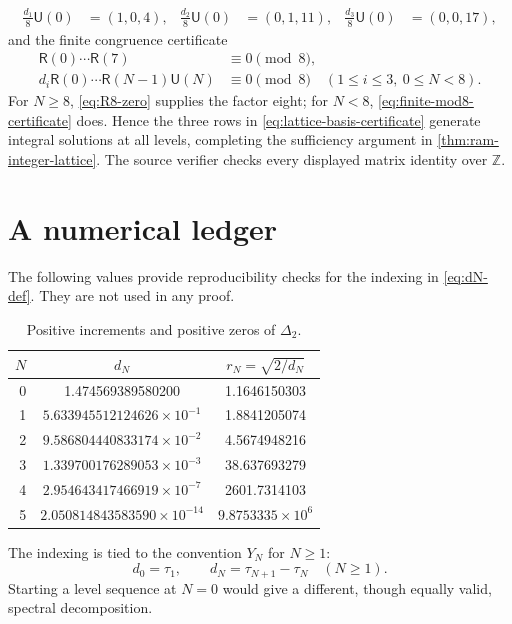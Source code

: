 \documentclass[11pt]{article}
\theoremstyle{keio}
\theoremstyle{definition}
\theoremstyle{remark}
\newcommand{\Z}{\mathbb Z}
\begin{document}
\begin{align}
 \frac{d_1}{8}\mathsf U(0)&=(1,0,4),&
 \frac{d_2}{8}\mathsf U(0)&=(0,1,11),&
 \frac{d_3}{8}\mathsf U(0)&=(0,0,17),
 \label{eq:lattice-basis-certificate}
\end{align}
and the finite congruence certificate
\begin{align}
 \mathsf R(0)\cdots\mathsf R(7)&\equiv0\pmod8,
 \label{eq:R8-zero}\\
 d_i\mathsf R(0)\cdots\mathsf R(N-1)\mathsf U(N)&\equiv0\pmod8
 \quad(1\le i\le3,\ 0\le N<8).
 \label{eq:finite-mod8-certificate}
\end{align}
For \(N\ge8\), \eqref{eq:R8-zero} supplies the factor eight; for
\(N<8\), \eqref{eq:finite-mod8-certificate} does.  Hence the three rows in
\eqref{eq:lattice-basis-certificate} generate integral solutions at all
levels, completing the sufficiency argument in
\cref{thm:ram-integer-lattice}.  The source verifier checks every displayed
matrix identity over \(\Z\).

\section{A numerical ledger}
\label{app:numerics}

The following values provide reproducibility checks for the indexing in
\eqref{eq:dN-def}.  They are not used in any proof.

\begin{table}[ht]
\centering
\caption{Positive increments and positive zeros of \(\Delta_2\).}
\begin{tabular}{@{}rcc@{}}
\toprule
\(N\)&\(d_N\)&\(r_N=\sqrt{2/d_N}\)\\
\midrule
0&1.474569389580200&1.1646150303\\
1&\(5.633945512124626\times10^{-1}\)&1.8841205074\\
2&\(9.586804440833174\times10^{-2}\)&4.5674948216\\
3&\(1.339700176289053\times10^{-3}\)&38.637693279\\
4&\(2.954643417466919\times10^{-7}\)&2601.7314103\\
5&\(2.050814843583590\times10^{-14}\)&\(9.8753335\times10^6\)\\
\bottomrule
\end{tabular}
\end{table}

The indexing is tied to the convention \(Y_N\) for \(N\ge1\):
\[
 d_0=\tau_1,\qquad d_N=\tau_{N+1}-\tau_N\quad(N\ge1).
\]
Starting a level sequence at \(N=0\) would give a different, though equally
valid, spectral decomposition.
\end{document}
